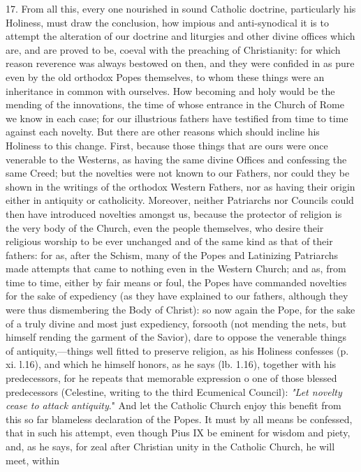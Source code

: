 17. From all this, every one nourished in sound Catholic doctrine,
particularly his Holiness, must draw the conclusion, how impious and
anti-synodical it is to attempt the alteration of our doctrine and
liturgies and other divine offices which are, and are proved to be,
coeval with the preaching of Christianity: for which reason reverence
was always bestowed on then, and they were confided in as pure even by
the old orthodox Popes themselves, to whom these things were an
inheritance in common with ourselves. How becoming and holy would be the
mending of the innovations, the time of whose entrance in the Church of
Rome we know in each case; for our illustrious fathers have testified
from time to time against each novelty. But there are other reasons
which should incline his Holiness to this change. First, because those
things that are ours were once venerable to the Westerns, as having the
same divine Offices and confessing the same Creed; but the novelties
were not known to our Fathers, nor could they be shown in the writings
of the orthodox Western Fathers, nor as having their origin either in
antiquity or catholicity. Moreover, neither Patriarchs nor Councils
could then have introduced novelties amongst us, because the protector
of religion is the very body of the Church, even the people themselves,
who desire their religious worship to be ever unchanged and of the same
kind as that of their fathers: for as, after the Schism, many of the
Popes and Latinizing Patriarchs made attempts that came to nothing even
in the Western Church; and as, from time to time, either by fair means
or foul, the Popes have commanded novelties for the sake of expediency
(as they have explained to our f\textquotesingle athers, although they
were thus dismembering the Body of Christ): so now again the Pope, for
the sake of a truly divine and most just expediency, forsooth (not
mending the nets, but himself rending the garment of the Savior), dare
to oppose the venerable things of antiquity,---things well fitted to
preserve religion, as his Holiness confesses (p. xi. l.16), and which he
himself honors, as he says (lb. 1.16), together with his predecessors,
for he repeats that memorable expression o one of those blessed
predecessors (Celestine, writing to the third Ecumenical Council):
\emph{"Let novelty cease to attack antiquity}." And let the Catholic
Church enjoy this benefit from this so far blameless declaration of the
Popes. It must by all means be confessed, that in such his attempt, even
though Pius IX be eminent for wisdom and piety, and, as he says, for
zeal after Christian unity in the Catholic Church, he will meet, within
